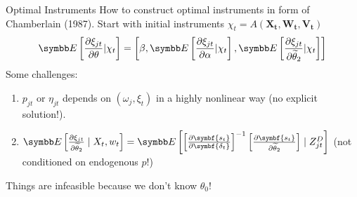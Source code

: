 \documentclass[aspectratio=169,10pt]{beamer}
\begin{document}


\begin{frame}{Optimal Instruments}
How to construct optimal instruments in form of Chamberlain (1987). Start with initial instruments $\chi_t = A\left(\symbf{X_t},\symbf{W_t},\symbf{V_t}\right)$
\begin{eqnarray*}
\E\left[\frac{\partial \xi_{jt}}{\partial \theta} | \chi_{t} \right] = \left[\beta, \E\left[\frac{\partial \xi_{jt}}{\partial \alpha} | \chi_{t} \right] ,
 \E\left[\frac{\partial \xi_{jt}}{\partial \widetilde{\theta}_2} | \chi_{t} \right] \right]
\end{eqnarray*}
Some challenges:
\begin{enumerate}
\item $p_{jt}$ or $\eta_{jt}$ depends on $(\omega_{j},\xi_{t})$ in a highly nonlinear way (no explicit solution!).
\item $\E\left[\frac{\partial \xi_{jt}}{\partial \widetilde{\theta}_2} \mid X_t, w_{t} \right] =\E\left[\left[\frac{\partial \symbf{s_t}}{\partial \symbf{\delta_t}}\right]^{-1} 
\left[\frac{\partial \symbf{s_t}}{\partial \widetilde{\theta}_2}\right] \mid Z_{jt}^D \right]$  (not conditioned on endogenous $p$!)
\end{enumerate}
Things are \alert{infeasible} because we don't know $\theta_0$!
\end{frame}
\end{document}
